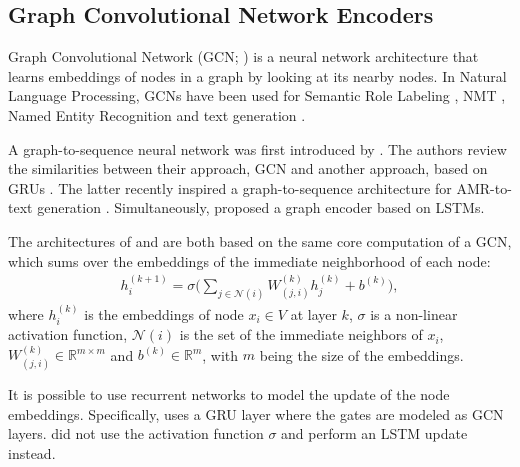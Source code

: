 \documentclass[11pt,a4paper]{article}
\begin{document}
\subsection{Graph Convolutional Network Encoders}
\label{sec:graph_encoders}

Graph Convolutional Network (GCN; \citealt{duvenaud2015convolutional,kipf2016semi}) is a neural network architecture that learns embeddings of nodes in a graph by looking at its nearby nodes. 
In Natural Language Processing, GCNs have been used for Semantic Role Labeling \cite{marcheggiani2017encoding}, NMT \cite{bastings2017graph}, Named Entity Recognition \cite{cetoli2017graph} and text generation \cite{diego}.


A graph-to-sequence neural network was first introduced by . The authors review the similarities between their approach, GCN and another approach, based on GRUs \cite{li2015gated}. The latter recently inspired a graph-to-sequence architecture for AMR-to-text generation \cite{beck}. Simultaneously,  proposed a graph encoder based on LSTMs. 

The architectures of  and  are both based on the same core computation of a GCN, which sums over the embeddings of the immediate neighborhood of each node: 
\begin{align*}
h_i^{(k + 1)} = \sigma \Bigg( \sum_{j \in \mathcal{N}(i)}{W_{(j,i)}^{(k)}} h_j^{(k)} + b^{(k)}  \Bigg),
\end{align*}
where $h_i^{(k)}$ is the embeddings of node $x_i \in V$ at layer $k$, $\sigma$ is a non-linear activation function, $\mathcal{N}(i)$ is the set of the immediate neighbors of $x_i$, $W_{(j,i)}^{(k)} \in \mathbb{R}^{m \times m}$ and $b^{(k)} \in \mathbb{R}^{m}$, with $m$ being the size of the embeddings.
  
It is possible to use recurrent networks to model the update of the node embeddings. Specifically,  uses a GRU layer where the gates are modeled as GCN layers. 
 did not use the activation function $\sigma$ and perform an LSTM update instead. 
\end{document}
